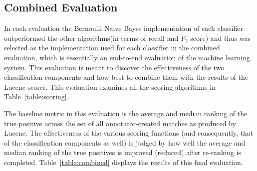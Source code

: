\subsection {Combined Evaluation}

In each evaluation the Bernoulli Naive Bayes implementation of each classifier outperformed the other algorithms(in terms of recall and $F_2$ score) and thus was selected as the implementation used for each classifier in the combined evaluation, which is essentially an end-to-end evaluation of the machine learning system.  This evaluation is meant to discover the effectiveness of the two classification components and how best to combine them with the results of the Lucene scorer.  This evaluation examines all the scoring algorithms in Table~\ref{table:scoring}.  

The baseline metric in this evaluation is the average and median ranking of the true positive across the set of all annotator-created matches as produced by Lucene.  The effectiveness of the various scoring functions (and consequently, that of the classification components as well) is judged by how well the average and median ranking of the true positives is improved (reduced) after re-ranking is completed.  Table~\ref{table:combined} displays the results of this final evaluation.

